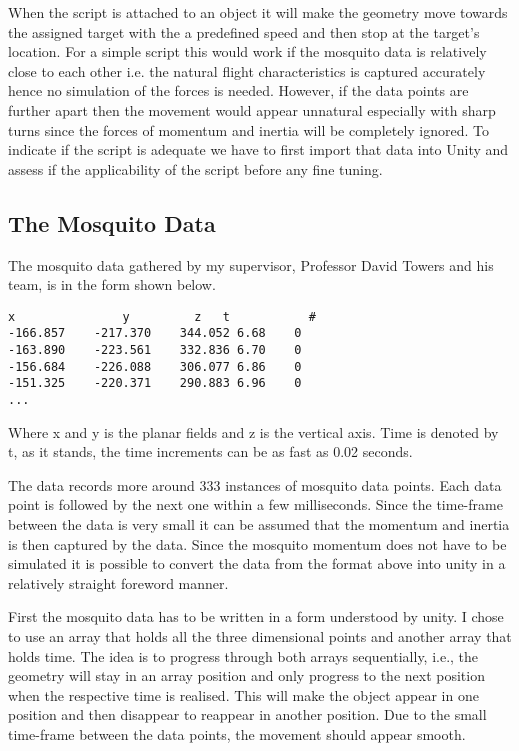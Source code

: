 When the script is attached to an object it will make the geometry move towards the assigned target with the a predefined speed and then stop at the target's location. For a simple script this would work if the mosquito data is relatively close to each other i.e. the natural flight characteristics is captured accurately hence no simulation of the forces is needed. However, if the data points are further apart then the movement would appear unnatural especially with sharp turns since the forces of momentum and inertia will be completely ignored. To indicate if the script is adequate we have to first import that data into Unity and assess if the applicability of the script before any fine tuning.



\subsection{The Mosquito Data}
The mosquito data gathered by my supervisor, Professor David Towers and his team, is in the form shown below.

\begin{verbatim}
x	            y	      z	  t           #
-166.857	-217.370	344.052	6.68	0
-163.890	-223.561	332.836	6.70	0
-156.684	-226.088	306.077	6.86	0
-151.325	-220.371	290.883	6.96	0
...
\end{verbatim}

Where x and y is the planar fields and z is the vertical axis. Time is denoted by t, as it stands, the time increments can be as fast as 0.02 seconds.

The data records more around 333 instances of mosquito data points. Each data point is followed by the next one within a few milliseconds. Since the time-frame between the data is very small it can be assumed that the momentum and inertia is then captured by the data. Since the mosquito momentum does not have to be simulated it is possible to convert the data from the format above into unity in a relatively straight foreword manner.

First the mosquito data has to be written in a form understood by unity. I chose to use an array that holds all the three dimensional points and another array that holds time. The idea is to progress through both arrays sequentially, i.e., the geometry will stay in an array position and only progress to the next position when the respective time is realised. This will make the object appear in one position and then disappear to reappear in another position. Due to the small time-frame between the data points, the movement should appear smooth. 

